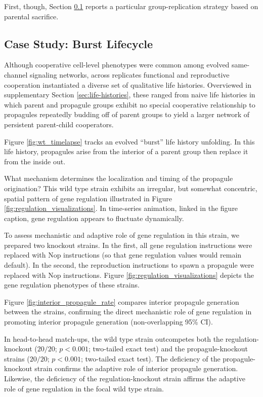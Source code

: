 First, though, Section \ref{sec:gene-regulation} reports a particular group-replication strategy based on parental sacrifice.

\subsection{Case Study: Burst Lifecycle} \label{sec:gene-regulation}

Although cooperative cell-level phenotypes were common among evolved same-channel signaling networks, across replicates functional and reproductive cooperation instantiated a diverse set of qualitative life histories.
Overviewed in supplementary Section \ref{sec:life-histories}, these ranged from naive life histories in which parent and propagule groups exhibit no special cooperative relationship to propagules repeatedly budding off of parent groups to yield a larger network of persistent parent-child cooperators.



Figure \ref{fig:wt_timelapse} tracks an evolved ``burst'' life history unfolding.
In this life history, propagules arise from the interior of a parent group then replace it from the inside out.

What mechanism determines the localization and timing of the propagule origination?
This wild type strain exhibits an irregular, but somewhat concentric, spatial pattern of gene regulation illustrated in Figure \ref{fig:regulation_visualizations}.
In time-series animation, linked in the figure caption, gene regulation appears to fluctuate dynamically.

To assess mechanistic and adaptive role of gene regulation in this strain, we prepared two knockout strains.
In the first, all gene regulation instructions were replaced with Nop instructions (so that gene regulation values would remain default).
In the second, the reproduction instructions to spawn a propagule were replaced with Nop instructions.
Figure \ref{fig:regulation_visualizations} depicts the gene regulation phenotypes of these strains.

Figure \ref{fig:interior_propagule_rate} compares interior propagule generation between the strains, confirming the direct mechanistic role of gene regulation in promoting interior propagule generation (non-overlapping 95\% CI).

In head-to-head match-ups, the wild type strain outcompetes both the regulation-knockout ($20/20$; $p < 0.001$; two-tailed exact test) and the propagule-knockout strains
($20/20$; $p < 0.001$; two-tailed exact test).
The deficiency of the propagule-knockout strain confirms the adaptive role of interior propagule generation.
Likewise, the deficiency of the regulation-knockout strain affirms the adaptive role of gene regulation in the focal wild type strain.

